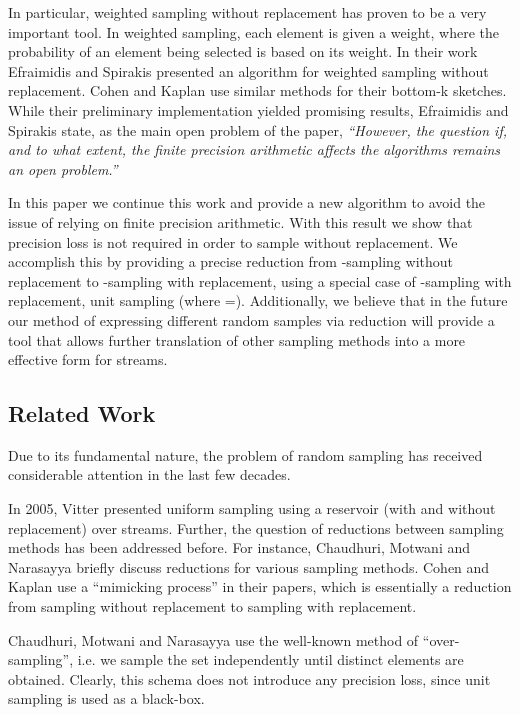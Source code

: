 \documentclass{llncs}
\begin{document}
In particular, weighted sampling without replacement has proven to be a very important tool. In weighted sampling,  each element is given a weight, where the probability of an element being selected is based on its weight. 
In their work Efraimidis and Spirakis \cite{weighted_power} presented an algorithm for weighted sampling
without replacement. Cohen and Kaplan \cite{Cohen:2008:TEU:1453856.1453884} use similar methods for their bottom-k
sketches. While their preliminary implementation yielded promising results, Efraimidis and Spirakis \cite{weighted_power} state, as the main open problem of the paper, \emph{``However, the question if, and to what extent, the finite precision arithmetic affects the algorithms remains an open problem.''}

In this paper we continue this work and provide a new algorithm to avoid the issue of relying on finite precision arithmetic. With this result we show that precision loss is not required in order to sample without replacement. We accomplish this by providing a precise reduction from -sampling without replacement to -sampling with replacement, using a special case of -sampling with replacement, unit sampling (where =).  Additionally, we believe that in the future our method of expressing different random samples via reduction will provide a tool that allows further translation of other sampling methods into a more effective form for streams.




\subsection{Related Work}
Due to its fundamental nature, the problem of random sampling has received considerable attention
in the last few decades.

In 2005, Vitter \cite{reservoir} presented uniform sampling using a reservoir (with
and without replacement) over streams.
Further, the question of reductions between sampling methods has been addressed before.
For instance, Chaudhuri, Motwani and Narasayya \cite{joins} briefly discuss reductions for various sampling methods.
Cohen and Kaplan \cite{Cohen:2008:TEU:1453856.1453884} use a ``mimicking process'' in their papers, which is essentially a reduction
from sampling without replacement to sampling with replacement.

Chaudhuri, Motwani and Narasayya \cite{joins} use
the well-known method of ``over-sampling'', i.e. we sample the set independently
until  distinct elements are obtained. Clearly, this schema does not introduce any precision loss,
since unit sampling is used as a black-box.
\end{document}
